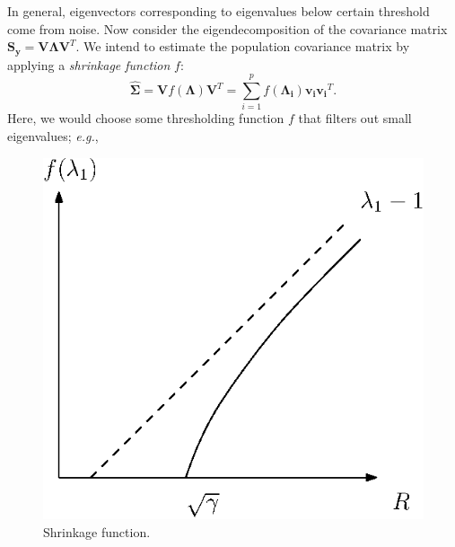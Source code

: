 \documentclass[11pt]{article}
\theoremstyle{definition}
\begin{document}
In general, eigenvectors corresponding to eigenvalues below certain threshold come from noise. Now consider the eigendecomposition of the covariance matrix $\mathbf{S_y} = \mathbf{V}\bm{\Lambda} \mathbf{V}^T$. We intend to estimate the population covariance matrix by  applying a {\it shrinkage function} $f$:
\[
    \bm{ \widehat{\Sigma} }= \mathbf{V}f(\bm{\Lambda})\mathbf{V}^T = \sum_{i=1}^p f(\bm{\Lambda_i})\mathbf{v_i} \mathbf{v_i}^T.
\]
Here, we would choose some thresholding function $f$ that filters out small eigenvalues; \textit{e.g.},
\begin{figure}[htbp]
    \centering
    \includegraphics[scale=.90]{./fig/shrink.eps}
    \caption{Shrinkage function.}
\end{figure}
\end{document}
